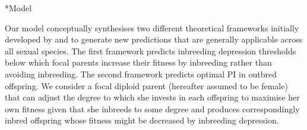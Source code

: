 \documentclass[12pt]{article}
\makeatletter
\renewcommand\section{\@startsection{section}{1}{0in}{-0.5\baselineskip}{0.1\baselineskip}{\normalfont\large\bfseries}}
\makeatother
\begin{document}
\section*{Model}

Our model conceptually synthesises two different theoretical frameworks initially developed by \cite{Parker1979} and \cite{Macnair1978} to generate new predictions that are generally applicable across all sexual species. The first framework \cite[][]{Parker1979} predicts inbreeding depression thresholds below which focal parents increase their fitness by inbreeding rather than avoiding inbreeding. The second framework \cite[][]{Macnair1978} predicts optimal PI in outbred offspring. We consider a focal diploid parent (hereafter assumed to be female) that can adjust the degree to which she invests in each offspring to maximise her own fitness given that she inbreeds to some degree and produces correspondingly inbred offspring whose fitness might be decreased by inbreeding depression.  
\end{document}
